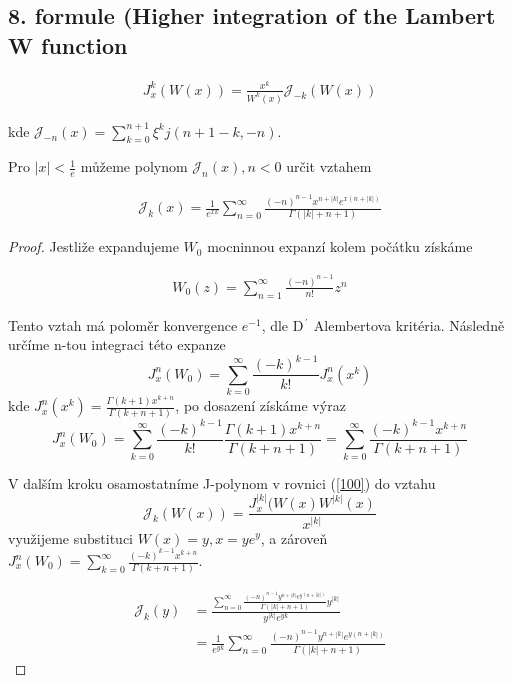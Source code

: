 \subsection{8. formule (Higher integration of the Lambert W function}

\begin{definition}
        \begin{align}
                J^k_x(W(x)) = \frac{x^k}{W^k(x)} 
                \mathcal{J}_{-k}(W(x))
        \end{align}
        
        kde \(\mathcal{J}_{-n}(x) =
        \sum_{k=0}^{n+1}\xi^k j(n+1 - k, -n ) \).
\end{definition}

\begin{theorem}
        Pro \(|x|<\frac{1}{e}\) můžeme polynom 
        \(\mathcal{J}_n(x), n <0\) určit vztahem 
        
        \begin{align}
                \mathcal{J}_k(x)=\frac{1}{e^{xk}}\sum_{n=0}^\infty 
                \frac{(-n)^{n-1}x^{n+|k|}e^{x(n+|k|)}}{\Gamma(|k|+n+1)}
        \end{align}
\end{theorem}

\begin{proof}
        Jestliže expandujeme \(W_0\) mocninnou expanzí kolem počátku získáme
        
        \begin{align}
                W_0(z) = \sum_{n=1}^\infty \frac{(-n)^{n-1}}{n!}z^n
        \label{101}
        \end{align}
        
        Tento vztah má poloměr konvergence \(e^{-1}\), dle D\(^{´}\)
        Alembertova kritéria. Následně určíme n-tou integraci této expanze
        \[J_x^n(W_0) = \sum_{k=0}^\infty \frac{(-k)^{k-1}}{k!} J_x^n(x^k)\]
        kde \(J_x^n(x^k) = \frac{\Gamma(k+1)x^{k+n}}{\Gamma(k+n+1)}\), po 
        dosazení získáme výraz
        \[J_x^n(W_0) = \sum_{k=0}^\infty \frac{(-k)^{k-1}}{k!}  
        \frac{\Gamma(k+1)x^{k+n}}{\Gamma(k+n+1)} = \sum_{k=0}^\infty
        \frac{(-k)^{k-1}x^{k+n}}{\Gamma(k+n+1)}\]

        V dalším kroku osamostatníme J-polynom v rovnici (\ref{100}) do vztahu
        \[\mathcal{J}_k(W(x)) = \frac{J_x^{|k|}(W(x) W^{|k|}(x)}{x^{|k|}}\]
        využijeme substituci \(W(x) = y, x = ye^y\), a zároveň \(J_x^n(W_0)=
        \sum_{k=0}^\infty \frac{(-k)^{k-1}x^{k+n}}{\Gamma(k+n+1)}\).
        
        \begin{align*}
                \mathcal{J}_k(y) &= \frac{\sum_{n=0}^\infty \frac{(-n)^{n-1}y^{
                n+|k|}e^{y(n+|k|)}}{\Gamma(|k|+n+1)} y^{|k|}}{y^{|k|} e^{yk}} \\
                &= \frac{1}{e^{yk}}\sum_{n=0}^\infty \frac{(-n)^{n-1}y^{n+|k|}
                e^{y(n+|k|)}}{\Gamma(|k|+n+1)}
        \end{align*}
\end{proof}

